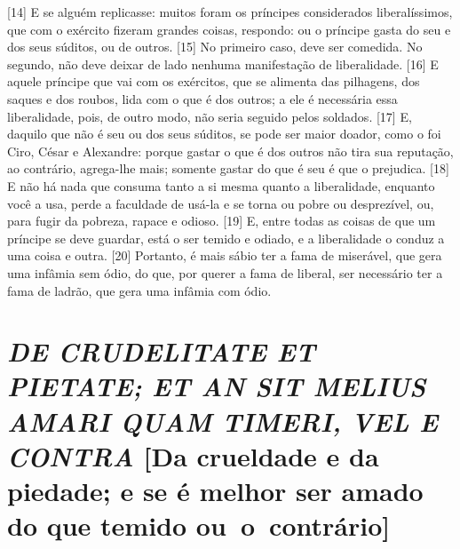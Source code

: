 {[}14{]} E se alguém replicasse: muitos foram os príncipes considerados
liberalíssimos, que com o exército fizeram grandes coisas, respondo: ou
o príncipe gasta do seu e dos seus súditos, ou de outros. {[}15{]} No
primeiro caso, deve ser comedida. No segundo, não deve deixar de lado
nenhuma manifestação de liberalidade. {[}16{]} E aquele príncipe que vai
com os exércitos, que se alimenta das pilhagens, dos saques e dos
roubos, lida com o que é dos outros; a ele é necessária essa
liberalidade, pois, de outro modo, não seria seguido pelos soldados.
{[}17{]} E, daquilo que não é seu ou dos seus súditos, se pode ser maior
doador, como o foi Ciro, César e Alexandre: porque gastar o que é dos
outros não tira sua reputação, ao contrário, agrega-lhe mais; somente
gastar do que é seu é que o prejudica. {[}18{]} E não há nada que
consuma tanto a si mesma quanto a liberalidade, enquanto você a usa,
perde a faculdade de usá-la e se torna ou pobre ou desprezível, ou, para
fugir da pobreza, rapace e odioso. {[}19{]} E, entre todas as coisas de
que um príncipe se deve guardar, está o ser temido e odiado, e a
liberalidade o conduz a uma coisa e outra. {[}20{]} Portanto, é mais
sábio ter a fama de miserável, que gera uma infâmia sem ódio, do que,
por querer a fama de liberal, ser necessário ter a fama de ladrão, que
gera uma infâmia com ódio.

\quebra\section{\emph{DE CRUDELITATE ET PIETATE; ET AN SIT MELIUS AMARI QUAM TIMERI, VEL
E CONTRA}\break
{[}Da crueldade e da piedade; e se é melhor ser amado do que temido ou~o~contrário{]}}

